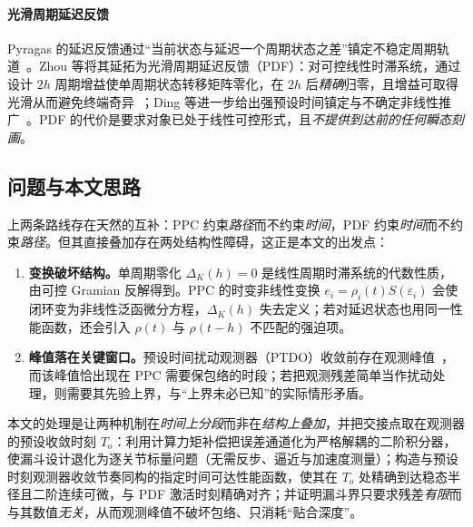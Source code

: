 \paragraph{光滑周期延迟反馈}
Pyragas 的延迟反馈通过“当前状态与延迟一个周期状态之差”镇定不稳定周期轨道~\cite{pyragas1992}。Zhou 等将其延拓为光滑周期延迟反馈（PDF）：对可控线性时滞系统，通过设计 \(2h\) 周期增益使单周期状态转移矩阵零化，在 \(2h\) 后\emph{精确}归零，且增益可取得光滑从而避免终端奇异~\cite{zhouFixedtimeStabilizationLinear2022}；Ding 等进一步给出强预设时间镇定与不确定非线性推广~\cite{dingStrongPrescribedtimeStabilization2024}。PDF 的代价是要求对象已处于线性可控形式，且\emph{不提供到达前的任何瞬态刻画}。

\subsection{问题与本文思路}
\label{sec:intro_problem}

上两条路线存在天然的互补：PPC 约束\emph{路径}而不约束\emph{时间}，PDF 约束\emph{时间}而不约束\emph{路径}。但其直接叠加存在两处结构性障碍，这正是本文的出发点：

\begin{enumerate}
  \item[(a)] \textbf{变换破坏结构。}单周期零化 \(\Delta_K(h)=0\) 是线性周期时滞系统的代数性质，由可控 Gramian 反解得到。PPC 的时变非线性变换 \(e_i=\rho_i(t)S(\varepsilon_i)\) 会使闭环变为非线性泛函微分方程，\(\Delta_K(h)\) 失去定义；若对延迟状态也用同一性能函数，还会引入 \(\rho(t)\) 与 \(\rho(t-h)\) 不匹配的强迫项。
  \item[(b)] \textbf{峰值落在关键窗口。}预设时间扰动观测器（PTDO）收敛前存在观测峰值~\cite{jiangPrescribedtimeDisturbanceObserver2024}，而该峰值恰出现在 PPC 需要保包络的时段；若把观测残差简单当作扰动处理，则需要其先验上界，与“上界未必已知”的实际情形矛盾。
\end{enumerate}

本文的处理是让两种机制在\emph{时间上分段}而非在\emph{结构上叠加}，并把交接点取在观测器的预设收敛时刻 \(T_o\)：利用计算力矩补偿把误差通道化为严格解耦的二阶积分器，使漏斗设计退化为逐关节标量问题（无需反步、逼近与加速度测量）；构造与预设时刻观测器收敛节奏同构的指定时间可达性能函数，使其在 \(T_o\) 处精确到达稳态半径且二阶连续可微，与 PDF 激活时刻精确对齐；并证明漏斗界只要求残差\emph{有限}而与其数值\emph{无关}，从而观测峰值不破坏包络、只消耗“贴合深度”。

